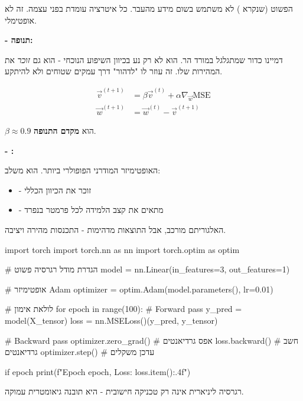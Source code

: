
 הפשוט (שנקרא ) לא משתמש בשום מידע מהעבר. כל איטרציה עומדת בפני עצמה. זה לא אופטימלי.

\textbf{ - תנופה:}

דמיינו כדור שמתגלגל במורד הר. הוא לא רק נע בכיוון השיפוע הנוכחי - הוא גם \textit{זוכר} את המהירות שלו. זה עוזר לו "לדהור" דרך עמקים שטוחים ולא להיתקע.

\begin{align}
\vec{v}^{(t+1)} &= \beta \vec{v}^{(t)} + \alpha \nabla_{\vec{w}} \text{MSE} \\
\vec{w}^{(t+1)} &= \vec{w}^{(t)} - \vec{v}^{(t+1)}
\end{align}

$\beta \approx 0.9$ הוא \textbf{מקדם התנופה}.

\textbf{ - :}

האופטימיזר המודרני הפופולרי ביותר. הוא משלב:
\begin{itemize}
\item {} - זוכר את הכיוון הכללי
\item {} - מתאים את קצב הלמידה לכל פרמטר בנפרד
\end{itemize}

האלגוריתם מורכב, אבל התוצאות מדהימות - התכנסות מהירה ויציבה.

\begin{pythonbox}
import torch
import torch.nn as nn
import torch.optim as optim

# הגדרת מודל רגרסיה פשוט
model = nn.Linear(in_features=3, out_features=1)

# אופטימיזר Adam
optimizer = optim.Adam(model.parameters(), lr=0.01)

# לולאת אימון
for epoch in range(100):
    # Forward pass
    y_pred = model(X_tensor)
    loss = nn.MSELoss()(y_pred, y_tensor)
    
    # Backward pass
    optimizer.zero_grad()  # אפס גרדיאנטים
    loss.backward()        # חשב גרדיאנטים
    optimizer.step()       # עדכן משקלים
    
    if epoch %
        print(f"Epoch {epoch}, Loss: {loss.item():.4f}")
\end{pythonbox}


רגרסיה ליניארית אינה רק טכניקה חישובית - היא תובנה גיאומטרית עמוקה.

